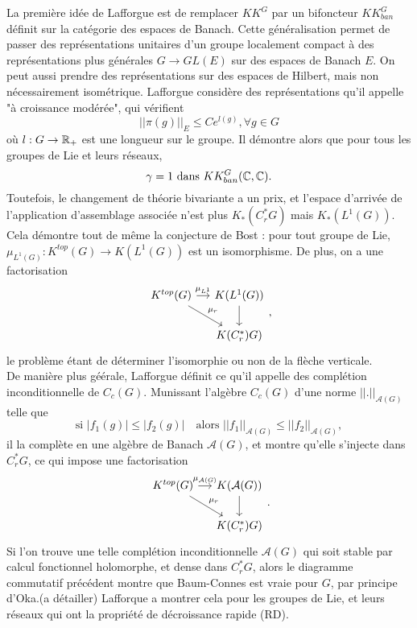 La première idée de Lafforgue est de remplacer $KK^G$ par un bifoncteur $KK^G_{ban}$ définit sur la catégorie des espaces de Banach. Cette généralisation permet de passer des représentations unitaires d'un groupe localement compact à des représentations plus générales $G\rightarrow GL(E)$ sur des espaces de Banach $E$. On peut aussi prendre des représentations sur des espaces de Hilbert, mais non nécessairement isométrique. Lafforgue considère des représentations qu'il appelle "à croissance modérée", qui vérifient
\[||\pi(g)||_E \leq C e^{l(g)},\forall g\in G\]
où $l:G\rightarrow \mathbb R_+$ est une longueur sur le groupe. Il démontre alors que pour tous les groupes de Lie et leurs réseaux, 
\[\gamma = 1 \ \text{dans }KK^G_{ban}(\C,\C).\]
Toutefois, le changement de théorie bivariante a un prix, et l'espace d'arrivée de l'application d'assemblage associée n'est plus $K_*(C^*_rG)$ mais $K_*(L^1(G))$. Cela démontre tout de même la conjecture de Bost : pour tout groupe de Lie, $\mu_{L^1(G)} : K^{top}(G)\rightarrow K(L^1(G))$ est un isomorphisme. De plus, on a une factorisation 
\[\begin{tikzcd}[column sep = small]
K^{top}(G) \arrow{r}{\mu_{L^1}}\arrow{dr}{\mu_r} & K(L^1(G)) \arrow{d}\\
					& K(C^*_r)G)
\end{tikzcd},\]
le problème étant de déterminer l'isomorphie ou non de la flèche verticale.\\

De manière plus géérale, Lafforgue définit ce qu'il appelle des complétion inconditionnelle de $C_c(G)$. Munissant l'algèbre $C_c(G)$ d'une norme $||.||_{\mathcal A(G)}$ telle que
\[\text{si } |f_1(g)|\leq |f_2(g)|\quad \text{alors } ||f_1||_{\mathcal A(G)}\leq||f_2||_{\mathcal A(G)},\]
il la complète en une algèbre de Banach $\mathcal A(G)$, et montre qu'elle s'injecte dans $C^*_r G$, ce qui impose une factorisation 
\[\begin{tikzcd}[column sep = small]
K^{top}(G) \arrow{r}{\mu_{\mathcal A(G)}}\arrow{dr}{\mu_r} & K(\mathcal A(G)) \arrow{d}\\
					& K(C^*_r)G)
\end{tikzcd}.\]
Si l'on trouve une telle complétion inconditionnelle $\mathcal A(G)$ qui soit stable par calcul fonctionnel holomorphe, et dense dans $C^*_r G$, alors le diagramme commutatif précédent montre que Baum-Connes est vraie pour $G$, par principe d'Oka.(a détailler) Lafforque a montrer cela pour les groupes de Lie, et leurs réseaux qui ont la propriété de décroissance rapide (RD).\\

